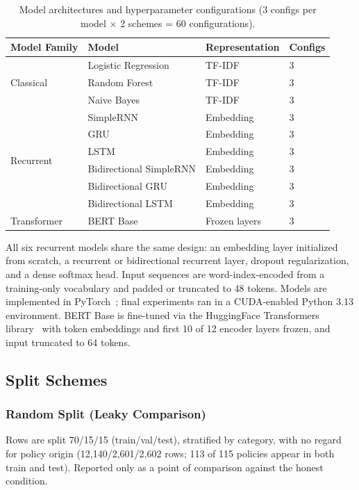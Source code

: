 \documentclass[11pt]{article}
\begin{document}
\begin{table}[t]
\centering
\begin{tabular}{@{}llll@{}}
\toprule
\textbf{Model Family} & \textbf{Model} & \textbf{Representation} & \textbf{Configs} \\
\midrule
\multirow{3}{*}{Classical} & Logistic Regression & TF-IDF & 3 \\
 & Random Forest & TF-IDF & 3 \\
 & Naive Bayes & TF-IDF & 3 \\
\midrule
\multirow{6}{*}{Recurrent} & SimpleRNN & Embedding & 3 \\
 & GRU & Embedding & 3 \\
 & LSTM & Embedding & 3 \\
 & Bidirectional SimpleRNN & Embedding & 3 \\
 & Bidirectional GRU & Embedding & 3 \\
 & Bidirectional LSTM & Embedding & 3 \\
\midrule
Transformer & BERT Base & Frozen layers & 3 \\
\bottomrule
\end{tabular}
\caption{Model architectures and hyperparameter configurations (3 configs per model $\times$ 2 schemes = 60 configurations).}
\label{tab:models}
\end{table}

All six recurrent models share the same design: an embedding layer initialized from scratch, a recurrent or bidirectional recurrent layer, dropout regularization, and a dense softmax head. Input sequences are word-index-encoded from a training-only vocabulary and padded or truncated to 48 tokens. Models are implemented in PyTorch~\cite{paszke-etal-2019-pytorch}; final experiments ran in a CUDA-enabled Python 3.13 environment. BERT Base is fine-tuned via the HuggingFace Transformers library~\cite{wolf-etal-2020-transformers} with token embeddings and first 10 of 12 encoder layers frozen, and input truncated to 64 tokens.

\subsection{Split Schemes}

\subsubsection{Random Split (Leaky Comparison)}

Rows are split 70/15/15 (train/val/test), stratified by category, with no regard for policy origin (12,140/2,601/2,602 rows; 113 of 115 policies appear in both train and test). Reported only as a point of comparison against the honest condition.
\end{document}
